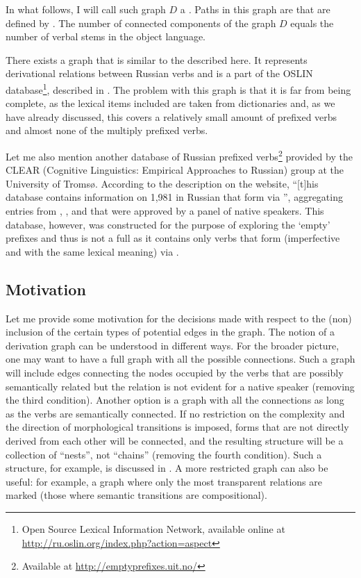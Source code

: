 In what follows, I will call such graph $D$ a \textit{.} Paths in this graph are  that are defined by . The number of connected components of the graph $D$ equals the number of verbal stems in the object language.

There exists a graph that is similar to the  described here. It represents derivational relations between Russian verbs and is a part of the OSLIN database\footnote{Open Source Lexical Information Network, available online at \url{http://ru.oslin.org/index.php?action=aspect}}, described in \cite{Borik:12}. The problem with this graph is that it is far from being complete, as the lexical items included are taken from dictionaries and, as we have already discussed, this covers a relatively small amount of prefixed verbs and almost none of the multiply prefixed verbs.

Let me also mention another database of Russian prefixed verbs\footnote{Available at \url{http://emptyprefixes.uit.no/}} provided by the CLEAR (Cognitive Linguistics: Empirical Approaches to Russian) group at the University of Troms{\o}. According to the description on the website, ``[t]his database contains information on 1,981  in Russian that form  via '', aggregating entries from \citet{MAS}, \citet{Ozegov:01},  and \citet{Cubberly:82} that were approved by a panel of native speakers. This database, however, was constructed for the purpose of exploring the `empty' prefixes and thus is not a full  as it contains only verbs that form  (imperfective and  with the same lexical meaning) via .

\subsection{Motivation}\label{section:chains:motivation}
Let me provide some motivation for the decisions made with respect to the (non) inclusion of the certain types of potential edges in the graph. The notion of a derivation graph can be understood in different ways. For the broader picture, one may want to have a full graph with all the possible connections. Such a graph will include edges connecting the nodes occupied by the verbs that are possibly semantically related but the relation is not evident for a native speaker (removing the third condition). Another option is a graph with all the connections as long as the verbs are semantically connected. If no restriction on the complexity and the direction of morphological transitions is imposed, forms that are not directly derived from each other will be connected, and the resulting structure will be a collection of ``nests'', not ``chains'' (removing the fourth condition). Such a structure, for example, is discussed in \citealt{Janda:10}. A more restricted graph can also be useful: for example, a graph where only the most transparent relations are marked (those where semantic transitions are compositional). 

